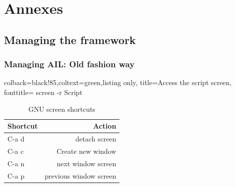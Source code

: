 \documentclass{beamer}
\begin{document}
\section{Annexes}


\subsection{Managing the framework}
\begin{frame}[fragile]
    \frametitle{Managing AIL: Old fashion way}
    \lstset{style=bash}
    \begin{tcblisting}{colback=black!85,coltext=green,listing only,
        title=Access the script screen, fonttitle=\bfseries}
screen -r Script
\end{tcblisting}
\begin{table}
        \caption{GNU screen shortcuts}
    \begin{tabular}{lr}
        \toprule
        Shortcut & Action \\
        \midrule
        C-a d & detach screen \\
        \midrule
        C-a c & Create new window \\
        \midrule
        C-a n & next window screen \\
        \midrule
        C-a p & previous window screen \\
        \bottomrule
    \end{tabular}
\end{table}
\end{frame}
\end{document}
